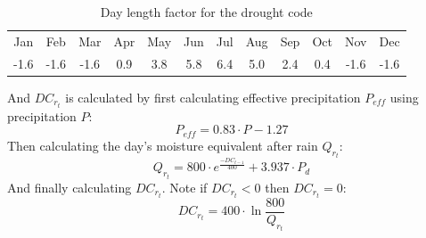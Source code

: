 \documentclass[twocolumn,10pt]{article}
\begin{document}
\begin{table}[!h]
    \centering
    \begin{tabular}{c|c|c|c|c|c|c|c|c|c|c|c}
        Jan & Feb & Mar & Apr & May & Jun & Jul & Aug & Sep & Oct & Nov & Dec  \\
        -1.6 & -1.6 & -1.6 & 0.9 & 3.8 & 5.8 & 6.4 & 5.0 & 2.4 & 0.4 & -1.6 & -1.6 \\
    \end{tabular}
    \caption{Day length factor for the drought code}
    \label{tab:day_factor}
\end{table}
 And $DC_{r_{t}}$ is calculated by first calculating effective precipitation $P_{eff}$ using precipitation $P$:
 \begin{equation}
 \label{eqn:dc3}
     P_{eff} = 0.83 \cdot P - 1.27
 \end{equation}
 Then calculating the day's moisture equivalent after rain $Q_{r_{t}}$:
 \begin{equation}
 \label{eqn:dc4}
     Q_{r_{t}} = 800 \cdot e^{\frac{-DC_{t-1}}{400}} + 3.937 \cdot P_{d}
 \end{equation}
 And finally calculating $DC_{r{_t}}$. Note if $DC_{r_{t}} <0$ then $DC_{r_{t}} = 0$:
 \begin{equation}
 \label{eqn:d5}
     DC_{r_{t}} = 400 \cdot \ln{\frac{800}{Q_{r_{t}}}}
 \end{equation}
\end{document}
